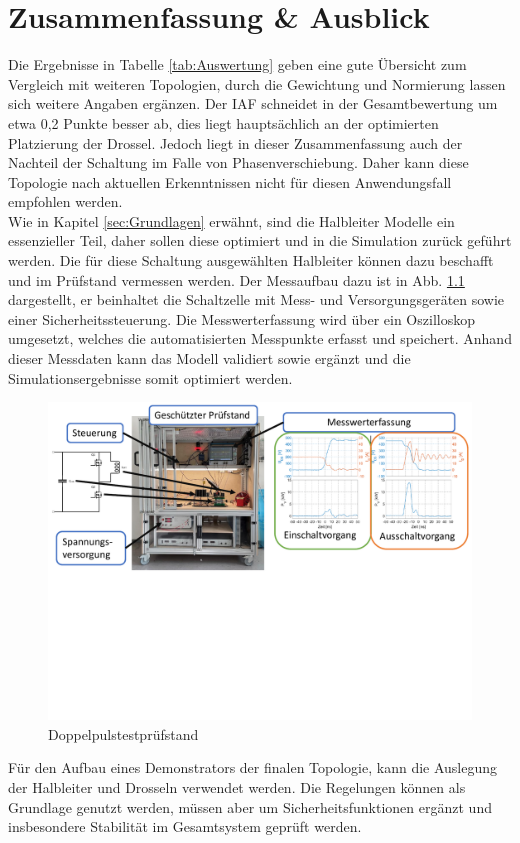 \chapter{Zusammenfassung \& Ausblick}
Die Ergebnisse in Tabelle \ref{tab:Auswertung} geben eine gute Übersicht zum Vergleich mit weiteren Topologien, durch die Gewichtung und Normierung lassen sich weitere Angaben ergänzen. Der \gls{IAF} schneidet in der Gesamtbewertung um etwa 0,2 Punkte besser ab, dies liegt hauptsächlich an der optimierten Platzierung der Drossel. Jedoch liegt in dieser Zusammenfassung auch der Nachteil der Schaltung im Falle von Phasenverschiebung. Daher kann diese Topologie nach aktuellen Erkenntnissen nicht für diesen Anwendungsfall empfohlen werden.\\ 


Wie in Kapitel \ref{sec:Grundlagen} erwähnt, sind die Halbleiter Modelle ein essenzieller Teil, daher sollen diese optimiert und in die Simulation zurück geführt werden. Die für diese Schaltung ausgewählten Halbleiter können dazu beschafft und im Prüfstand vermessen werden. Der Messaufbau dazu ist in Abb. \ref{fig:dpt} dargestellt, er beinhaltet die Schaltzelle mit Mess- und Versorgungsgeräten sowie einer Sicherheitssteuerung. Die Messwerterfassung wird über ein Oszilloskop umgesetzt, welches die automatisierten Messpunkte erfasst und speichert.  Anhand dieser Messdaten kann das Modell validiert sowie ergänzt und die Simulationsergebnisse somit optimiert werden. \\

 
\begin{figure}
	\centering
	\includegraphics[width=0.9\linewidth]{content/Grafiken/DPT}
	\caption[Doppelpulstestprüfstand]{Doppelpulstestprüfstand}
	\label{fig:dpt}
\end{figure}

Für den Aufbau eines Demonstrators der finalen Topologie, kann die Auslegung der Halbleiter und Drosseln verwendet werden. Die Regelungen können als Grundlage genutzt werden, müssen aber um Sicherheitsfunktionen ergänzt und insbesondere Stabilität im Gesamtsystem geprüft werden. 
